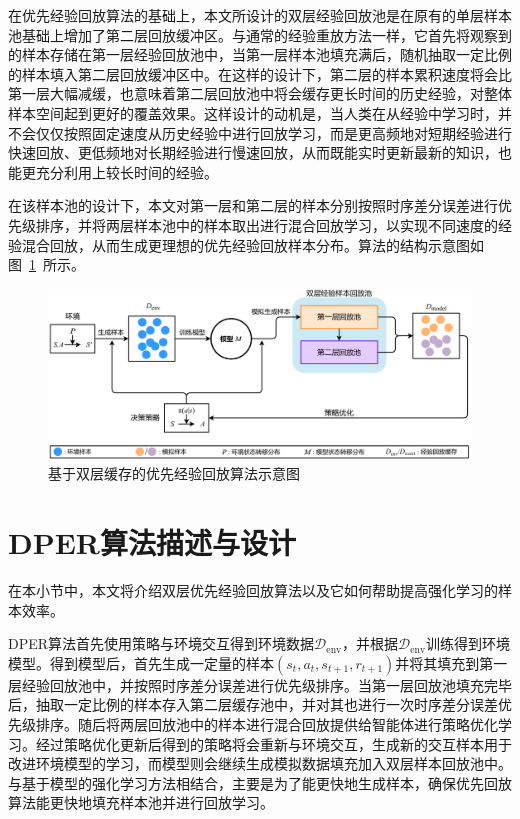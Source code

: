 在优先经验回放算法的基础上，本文所设计的双层经验回放池是在原有的单层样本池基础上增加了第二层回放缓冲区。与通常的经验重放方法一样，它首先将观察到的样本存储在第一层经验回放池中，当第一层样本池填充满后，随机抽取一定比例的样本填入第二层回放缓冲区中。在这样的设计下，第二层的样本累积速度将会比第一层大幅减缓，也意味着第二层回放池中将会缓存更长时间的历史经验，对整体样本空间起到更好的覆盖效果。这样设计的动机是，当人类在从经验中学习时，并不会仅仅按照固定速度从历史经验中进行回放学习，而是更高频地对短期经验进行快速回放、更低频地对长期经验进行慢速回放，从而既能实时更新最新的知识，也能更充分利用上较长时间的经验。

在该样本池的设计下，本文对第一层和第二层的样本分别按照时序差分误差进行优先级排序，并将两层样本池中的样本取出进行混合回放学习，以实现不同速度的经验混合回放，从而生成更理想的优先经验回放样本分布。算法的结构示意图如图~\ref{fig:algo-structure}~所示。

\begin{figure}[ht]
\centering
\includegraphics[width=\textwidth]{figures/dber.pdf}
\caption{基于双层缓存的优先经验回放算法示意图}
\label{fig:algo-structure}
\end{figure}

\section{DPER算法描述与设计}

在本小节中，本文将介绍双层优先经验回放算法以及它如何帮助提高强化学习的样本效率。

DPER算法首先使用策略与环境交互得到环境数据$\mathcal{D}_{\text{env}}$，并根据$\mathcal{D}_{\text{env}}$训练得到环境模型。得到模型后，首先生成一定量的样本$(s_t, a_t, s_{t+1}, r_{t+1})$并将其填充到第一层经验回放池中，并按照时序差分误差进行优先级排序。当第一层回放池填充完毕后，抽取一定比例的样本存入第二层缓存池中，并对其也进行一次时序差分误差优先级排序。随后将两层回放池中的样本进行混合回放提供给智能体进行策略优化学习。经过策略优化更新后得到的策略将会重新与环境交互，生成新的交互样本用于改进环境模型的学习，而模型则会继续生成模拟数据填充加入双层样本回放池中。与基于模型的强化学习方法相结合，主要是为了能更快地生成样本，确保优先回放算法能更快地填充样本池并进行回放学习。

